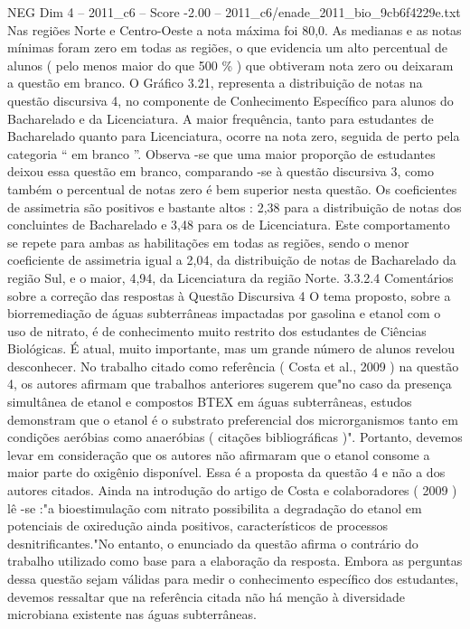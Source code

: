\begin{textsample}{NEG Dim 4 – 2011\_c6 – Score -2.00 – 2011\_c6/enade\_2011\_bio\_9cb6f4229e.txt}
Nas regiões Norte e Centro-Oeste a nota máxima foi 80,0.
As medianas e as notas mínimas foram zero em todas as regiões, o que evidencia um alto percentual de alunos ( pelo menos maior do que 500 \% ) que obtiveram nota zero ou deixaram a questão em branco.
O Gráfico 3.21, representa a distribuição de notas na questão discursiva 4, no componente de Conhecimento Específico para alunos do Bacharelado e da Licenciatura.
A maior frequência, tanto para estudantes de Bacharelado quanto para Licenciatura, ocorre na nota zero, seguida de perto pela categoria “ em branco ”.
Observa -se que uma maior proporção de estudantes deixou essa questão em branco, comparando -se à questão discursiva 3, como também o percentual de notas zero é bem superior nesta questão.
Os coeficientes de assimetria são positivos e bastante altos : 2,38 para a distribuição de notas dos concluintes de Bacharelado e 3,48 para os de Licenciatura.
Este comportamento se repete para ambas as habilitações em todas as regiões, sendo o menor coeficiente de assimetria igual a 2,04, da distribuição de notas de Bacharelado da região Sul, e o maior, 4,94, da Licenciatura da região Norte. 3.3.2.4 Comentários sobre a correção das respostas à Questão Discursiva 4 O tema proposto, sobre a biorremediação de águas subterrâneas impactadas por gasolina e etanol com o uso de nitrato, é de conhecimento muito restrito dos estudantes de Ciências Biológicas.
É atual, muito importante, mas um grande número de alunos revelou desconhecer.
No trabalho citado como referência ( Costa et al., 2009 ) na questão 4, os autores afirmam que trabalhos anteriores sugerem que"no caso da presença simultânea de etanol e compostos BTEX em águas subterrâneas, estudos demonstram que o etanol é o substrato preferencial dos microrganismos tanto em condições aeróbias como anaeróbias ( citações bibliográficas )".
Portanto, devemos levar em consideração que os autores não afirmaram que o etanol consome a maior parte do oxigênio disponível.
Essa é a proposta da questão 4 e não a dos autores citados.
Ainda na introdução do artigo de Costa e colaboradores ( 2009 ) lê -se :"a bioestimulação com nitrato possibilita a degradação do etanol em potenciais de oxiredução ainda positivos, característicos de processos desnitrificantes."No entanto, o enunciado da questão afirma o contrário do trabalho utilizado como base para a elaboração da resposta.
Embora as perguntas dessa questão sejam válidas para medir o conhecimento específico dos estudantes, devemos ressaltar que na referência citada não há menção à diversidade microbiana existente nas águas subterrâneas.

\end{textsample}

